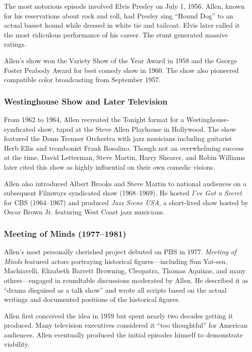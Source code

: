 \documentclass[11pt,letterpaper]{article}
\begin{document}
The most notorious episode involved Elvis Presley on July 1, 1956. Allen, known for his reservations about rock and roll, had Presley sing ``Hound Dog'' to an actual basset hound while dressed in white tie and tailcoat. Elvis later called it the most ridiculous performance of his career. The stunt generated massive ratings.

Allen's show won the Variety Show of the Year Award in 1958 and the George Foster Peabody Award for best comedy show in 1960. The show also pioneered compatible color broadcasting from September 1957.

\subsubsection{Westinghouse Show and Later Television}

From 1962 to 1964, Allen recreated the Tonight format for a Westinghouse-syndicated show, taped at the Steve Allen Playhouse in Hollywood. The show featured the Donn Trenner Orchestra with jazz musicians including guitarist Herb Ellis and trombonist Frank Rosolino. Though not an overwhelming success at the time, David Letterman, Steve Martin, Harry Shearer, and Robin Williams later cited this show as highly influential on their own comedic visions.

Allen also introduced Albert Brooks and Steve Martin to national audiences on a subsequent Filmways syndicated show (1968--1969). He hosted \textit{I've Got a Secret} for CBS (1964--1967) and produced \textit{Jazz Scene USA}, a short-lived show hosted by Oscar Brown Jr. featuring West Coast jazz musicians.

\subsubsection{Meeting of Minds (1977--1981)}

Allen's most personally cherished project debuted on PBS in 1977. \textit{Meeting of Minds} featured actors portraying historical figures---including Sun Yat-sen, Machiavelli, Elizabeth Barrett Browning, Cleopatra, Thomas Aquinas, and many others---engaged in roundtable discussions moderated by Allen. He described it as ``drama disguised as a talk show'' and wrote all scripts based on the actual writings and documented positions of the historical figures.

Allen first conceived the idea in 1959 but spent nearly two decades getting it produced. Many television executives considered it ``too thoughtful'' for American audiences. Allen eventually produced the initial episodes himself to demonstrate viability.
\end{document}
